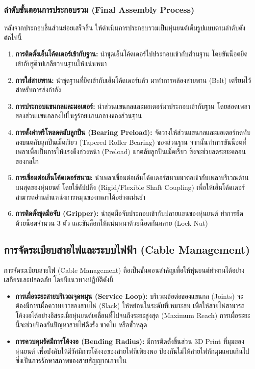 \subsubsection{ลำดับขั้นตอนการประกอบรวม (Final Assembly Process)}
\label{sec:final_assembly}
หลังจากประกอบชิ้นส่วนย่อยเสร็จสิ้น ให้ดำเนินการประกอบรวมเป็นหุ่นยนต์เต็มรูปแบบตามลำดับดังต่อไปนี้
\begin{enumerate}
    \item \textbf{การติดตั้งเอ็นโค้ดเดอร์เข้ากับฐาน:} นำชุดเอ็นโค้ดเดอร์ไปประกอบเข้ากับส่วนฐาน โดยขันน็อตยึดเข้ากับรูต๊าปเกลียวบนฐานให้แน่นหนา
    \item \textbf{การใส่สายพาน:} นำชุดฐานที่ยึดเข้ากับเอ็นโค้ดเดอร์แล้ว มาทำการคล้องสายพาน (Belt) เตรียมไว้สำหรับการส่งกำลัง
    \item \textbf{การประกอบแขนกลและมอเตอร์:} นำส่วนแขนกลและมอเตอร์มาประกอบเข้ากับฐาน โดยสอดเพลาของส่วนแขนกลลงไปในรูร้อยแกนกลางของส่วนฐาน
    \item \textbf{การตั้งค่าพรีโหลดตลับลูกปืน (Bearing Preload):} จัดวางให้ส่วนแขนกลและมอเตอร์กดทับลงบนตลับลูกปืนเม็ดเรียว (Tapered Roller Bearing) ของส่วนฐาน จากนั้นทำการขันน็อตที่เพลาเพื่อเป็นการให้แรงดึงล่วงหน้า (Preload) แก่ตลับลูกปืนเม็ดเรียว ซึ่งจะช่วยลดระยะคลอนของกลไก
    \item \textbf{การเชื่อมต่อเอ็นโค้ดเดอร์สนาม:} นำเพลาเชื่อมต่อเอ็นโค้ดเดอร์สนามมาต่อเข้ากับเพลาบริเวณด้านบนสุดของหุ่นยนต์ โดยใช้คัปปลิ้ง (Rigid/Flexible Shaft Coupling) เพื่อให้เอ็นโค้ดเดอร์สามารถอ่านตำแหน่งการหมุนของเพลาได้อย่างแม่นยำ
    \item \textbf{การติดตั้งชุดมือจับ (Gripper):} นำชุดมือจับประกอบเข้ากับปลายแขนของหุ่นยนต์ ทำการยึดด้วยน็อตจำนวน 3 ตัว และขันล็อกให้แน่นหนาด้วยน็อตกันคลาย (Lock Nut)
\end{enumerate}

\subsection{การจัดระเบียบสายไฟและระบบไฟฟ้า (Cable Management)}
\label{sec:cable_management}
การจัดระเบียบสายไฟ (Cable Management) ถือเป็นขั้นตอนสำคัญเพื่อให้หุ่นยนต์ทำงานได้อย่างเสถียรและปลอดภัย โดยมีแนวทางปฏิบัติดังนี้
\begin{itemize}
    \item \textbf{การเผื่อระยะสายบริเวณจุดหมุน (Service Loop):} บริเวณข้อต่อของแขนกล (Joints) จะต้องมีการเผื่อความยาวของสายไฟ (Slack) ให้หย่อนในระดับที่เหมาะสม เพื่อให้สายไฟสามารถโค้งงอได้อย่างอิสระเมื่อหุ่นยนต์เคลื่อนที่ไปจนถึงระยะสูงสุด (Maximum Reach) การเผื่อระยะนี้จะช่วยป้องกันปัญหาสายไฟดึงรั้ง ขาดใน หรือขั้วหลุด
    \item \textbf{การควบคุมรัศมีการโค้งงอ (Bending Radius):} มีการติดตั้งชิ้นส่วน 3D Print ที่มุมของหุ่นยนต์ เพื่อบังคับให้มีรัศมีการโค้งงอของสายไฟที่เพียงพอ ป้องกันไม่ให้สายไฟหักมุมแคบเกินไป ซึ่งเป็นการรักษาสภาพของสายสัญญาณภายใน
\end{itemize}

